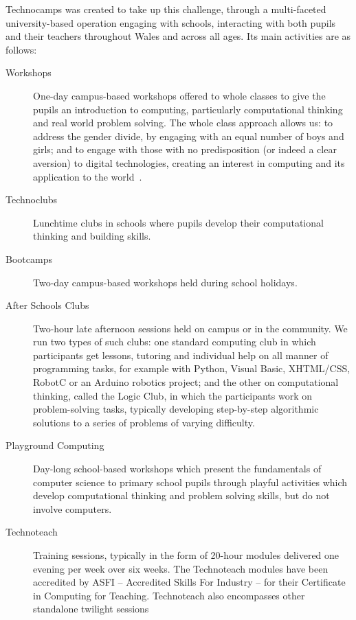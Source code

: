 \documentclass{sig-alternate}
\begin{document}
Technocamps was created to take up this challenge, through a
multi-faceted university-based operation engaging with schools,
interacting with both pupils and their teachers throughout Wales and
across all ages. Its main activities are as follows:

\begin{description}
\item[Workshops]
One-day campus-based workshops offered to whole classes
to give the pupils an introduction to computing,
particularly computational thinking and real world problem solving.
The whole class approach allows us: to address the gender divide,
by engaging with an equal number of boys and girls;
and to engage with those with no predisposition (or indeed a clear aversion)
to digital technologies, creating an interest in computing and its
application to the world~\cite{ball-et-al:2012}.
\item[Technoclubs\footnotemark]
Lunchtime clubs in schools where pupils develop
their computational thinking and building skills.
\item[Bootcamps]
Two-day campus-based workshops held during school holidays.
\item[After Schools Clubs]
Two-hour late afternoon sessions held on campus or in the community.
We run two types of such clubs: one standard computing club
in which participants get lessons, tutoring and individual help
on all manner of programming tasks, for example with Python, Visual
Basic, XHTML/CSS,  RobotC or an Arduino robotics project;
and the other on computational thinking, called the Logic Club,
in which the participants work on problem-solving tasks,
typically developing step-by-step algorithmic solutions
to a series of problems of varying difficulty.
\item[Playground Computing\footnotemark]
Day-long school-based workshops which present
the fundamentals of computer science to primary school pupils
through playful activities which develop computational thinking
and problem solving skills, but do not involve computers.
\item[Technoteach\footnotemark]
Training sessions, typically in the form of 20-hour modules
delivered one evening per week over six weeks.
The Technoteach modules have been accredited by ASFI
-- Accredited Skills For Industry --
for their Certificate in Computing for Teaching.
Technoteach also encompasses other standalone twilight sessions

\end{description}
\end{document}
